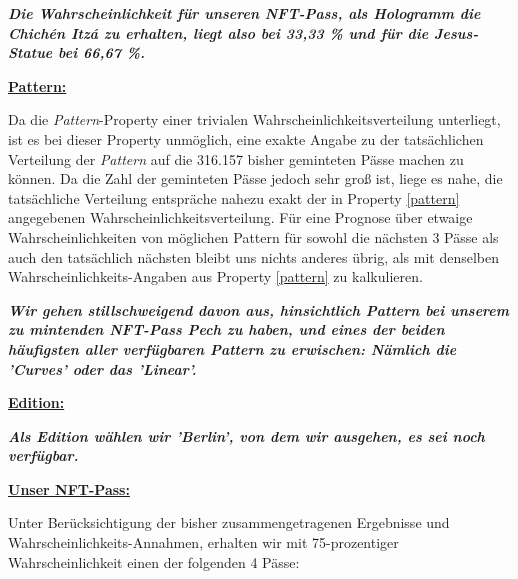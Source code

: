 \vspace{0.3cm}

\textbf{\textit{Die Wahrscheinlichkeit für unseren NFT-Pass, als Hologramm die Chichén Itzá zu erhalten, liegt also bei 33,33 \% und für die Jesus-Statue bei 66,67 \%.}}


\vspace{1.0cm}


\underline{\textbf{Pattern:}}

\vspace{0.2cm}

Da die \textit{Pattern}-Property einer trivialen Wahrscheinlichkeitsverteilung unterliegt, ist es bei dieser Property unmöglich, eine exakte Angabe zu der tatsächlichen Verteilung der \textit{Pattern} auf die 316.157 bisher geminteten Pässe machen zu können. Da die Zahl der geminteten Pässe jedoch sehr groß ist, liege es nahe, die tatsächliche Verteilung entspräche nahezu exakt der in Property \ref{pattern} angegebenen Wahrscheinlichkeitsverteilung. Für eine Prognose über etwaige Wahrscheinlichkeiten von möglichen Pattern für sowohl die nächsten 3 Pässe als auch den tatsächlich nächsten bleibt uns nichts anderes übrig, als mit denselben Wahrscheinlichkeits-Angaben aus Property \ref{pattern} zu kalkulieren.

\vspace{0.2cm}

\textbf{\textit{Wir gehen stillschweigend davon aus, hinsichtlich Pattern bei unserem zu mintenden NFT-Pass Pech zu haben, und eines der beiden häufigsten aller verfügbaren Pattern zu erwischen: Nämlich die 'Curves' oder das 'Linear'.}}


\vspace{1.0cm}


\underline{\textbf{Edition:}}

\vspace{0.2cm}

\textbf{\textit{Als Edition wählen wir 'Berlin', von dem wir ausgehen, es sei noch verfügbar.}}

\vspace{1.0cm}



\underline{\textbf{Unser NFT-Pass:}}

\vspace{0.2cm}

Unter Berücksichtigung der bisher zusammengetragenen Ergebnisse und Wahrscheinlichkeits-Annahmen, erhalten wir mit 75-prozentiger Wahrscheinlichkeit einen der folgenden 4 Pässe:

